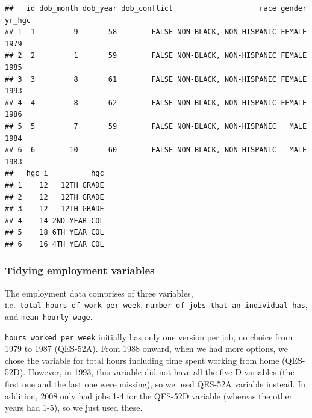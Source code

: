 \documentclass{article}
\begin{document}
\begin{verbatim}
##   id dob_month dob_year dob_conflict                    race gender yr_hgc
## 1  1         9       58        FALSE NON-BLACK, NON-HISPANIC FEMALE   1979
## 2  2         1       59        FALSE NON-BLACK, NON-HISPANIC FEMALE   1985
## 3  3         8       61        FALSE NON-BLACK, NON-HISPANIC FEMALE   1993
## 4  4         8       62        FALSE NON-BLACK, NON-HISPANIC FEMALE   1986
## 5  5         7       59        FALSE NON-BLACK, NON-HISPANIC   MALE   1984
## 6  6        10       60        FALSE NON-BLACK, NON-HISPANIC   MALE   1983
##   hgc_i          hgc
## 1    12   12TH GRADE
## 2    12   12TH GRADE
## 3    12   12TH GRADE
## 4    14 2ND YEAR COL
## 5    18 6TH YEAR COL
## 6    16 4TH YEAR COL
\end{verbatim}

\hypertarget{tidying-employment-variables}{%
\subsubsection{Tidying employment variables}\label{tidying-employment-variables}}

The employment data comprises of three variables, i.e.~\texttt{total\ hours\ of\ work\ per\ week}, \texttt{number\ of\ jobs\ that\ an\ individual\ has}, and \texttt{mean\ hourly\ wage}.

\texttt{hours\ worked\ per\ week} initially has only one version per job, no choice from 1979 to 1987 (QES-52A). From 1988 onward, when we had more options, we chose the variable for total hours including time spent working from home (QES-52D). However, in 1993, this variable did not have all the five D variables (the first one and the last one were missing), so we used QES-52A variable instead. In addition, 2008 only had jobs 1-4 for the QES-52D variable (whereas the other years had 1-5), so we just used these.
\end{document}
